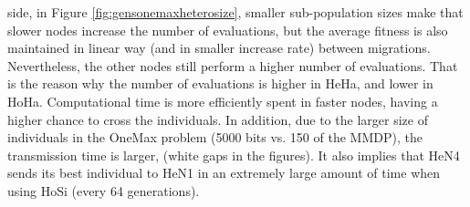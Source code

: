 side, in Figure \ref{fig:gensonemaxheterosize}, smaller sub-population
sizes make that slower nodes increase the number of evaluations,
but the average fitness is also maintained in linear way (and in
smaller increase rate) between migrations. Nevertheless, the other
nodes still perform a higher number of evaluations. That is the
reason why the number of evaluations is higher in HeHa, and lower in
HoHa. Computational time is more efficiently spent in faster nodes,
having a higher chance to cross the individuals. In addition, due to
the larger size of  individuals in the OneMax problem (5000 bits
vs. 150 of the MMDP), the transmission time is larger, (white gaps in the
figures). It also implies that HeN4 sends its best individual to
HeN1 in an extremely large amount of time when using HoSi (every 64
generations). 


\begin{table}
\caption{Results for the OneMax problem.}
\label{tab:onemaxresults}
\end{table}



